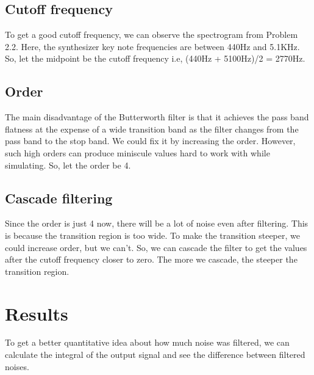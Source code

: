 \documentclass[journal,12pt]{IEEEtran}
\begin{document}
\subsection{\textbf{Cutoff frequency}}
To get a good cutoff frequency, we can observe the spectrogram from Problem 2.2. Here, the synthesizer key note frequencies are between 440Hz and 5.1KHz. So, let the midpoint be the cutoff frequency i.e, (440Hz + 5100Hz)/2 = 2770Hz.

\subsection{\textbf{Order}}
The main disadvantage of the Butterworth filter is that it achieves the pass band flatness at the expense of a wide transition band as the filter changes from the pass band to the stop band.
We could fix it by increasing the order. However, such high orders can produce miniscule values hard to work with while simulating. So, let the order be 4.

\subsection{\textbf{Cascade filtering}}
Since the order is just 4 now, there will be a lot of noise even after filtering. This is because the transition region is too wide. To make the transition steeper, we could increase order, but we can't. So, we can cascade the filter to get the values after the cutoff frequency closer to zero. The more we cascade, the steeper the transition region.

\section{\textbf{Results}}
To get a better quantitative idea about how much noise was filtered, we can calculate the integral of the output signal and see the difference between filtered noises.
\end{document}
